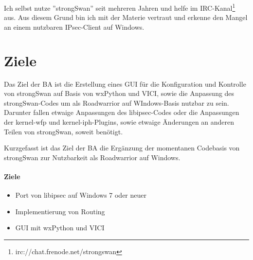 \documentclass[a4paper]{article}
\begin{document}
Ich selbst nutze ''strongSwan'' seit mehreren Jahren und helfe im \ac{IRC}-Kanal\footnote{irc://chat.frenode.net/strongswan}
aus. Aus diesem Grund bin ich mit der Materie vertraut und erkenne den Mangel an einem
nutzbaren IPsec-Client auf Windows.

\section{Ziele}
Das Ziel der \ac{BA} ist die Erstellung eines \ac{GUI} für die Konfiguration
und Kontrolle von strongSwan auf Basis von wxPython und \ac{VICI}, sowie
die Anpassung des strongSwan-Codes um als Roadwarrior auf WIndows-Basis nutzbar zu sein.
Darunter fallen etwaige Anpassungen des libipsec-Codes oder die Anpassungen der kernel-wfp
und kernel-iph-Plugins, sowie etwaige Änderungen an anderen Teilen von strongSwan, soweit
benötigt.

Kurzgefasst ist das Ziel der \ac{BA} die Ergänzung der momentanen Codebasis von strongSwan
zur Nutzbarkeit als Roadwarrior auf Windows.

\paragraph{Ziele}
\begin{itemize}
\item Port von libipsec auf Windows 7 oder neuer
\item Implementierung von Routing
\item \ac{GUI} mit wxPython und \ac{VICI}
\end{itemize}
\end{document}
